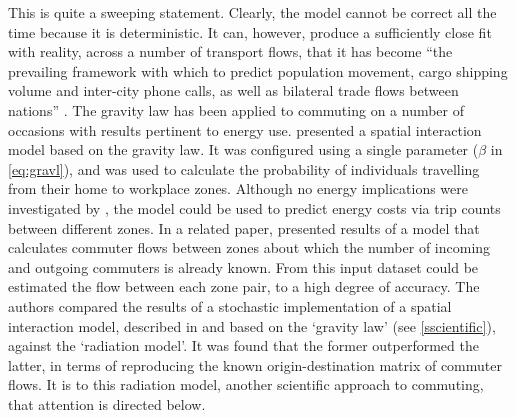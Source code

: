 This is quite a sweeping statement. Clearly, the model cannot be correct all
the time because it is deterministic. It can, however, produce a
sufficiently close fit with reality, across a number of transport flows, that it
has become ``the prevailing framework with which to predict population movement,
cargo shipping volume and inter-city phone calls, as well as bilateral trade
flows between nations'' \citep{Simini2012}. The gravity law has been applied to
commuting on a number of occasions with results pertinent to energy use.
\citet{gargiulo2012} presented a spatial interaction model based on the
gravity law. It was configured using a single parameter ($\beta$ in \cref{eq:gravl}),
and was used to calculate the probability of individuals travelling
from their home to workplace zones. Although no energy implications were investigated
by \citet{gargiulo2012}, the model could be used to
predict energy costs via trip counts between different zones.
In a related paper, \citet{Lenormandplosone2012} presented results of
a model that calculates commuter flows between zones about which the number
of incoming and outgoing commuters is already known. From this input dataset
could be estimated the flow between each zone pair, to a high degree of accuracy.
The authors compared the results of a stochastic implementation of a spatial interaction
model, described in \citep{Gargiulo2011} and based on the `gravity law' (see \cref{sscientific}),
against the `radiation model'. It was found that the former outperformed the latter,
in terms of reproducing the known origin-destination matrix of commuter flows. It is to
this radiation model, another scientific approach to commuting, 
that attention is directed below.

